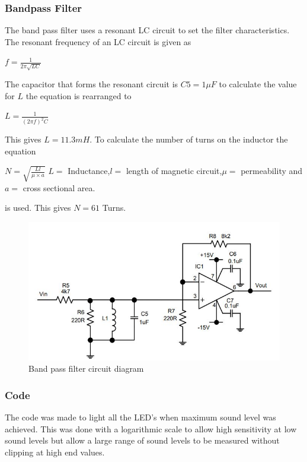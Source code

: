\documentclass[10pt,a4paper]{article}
\begin{document}
\subsubsection{Bandpass Filter}
The band pass filter uses a resonant LC circuit to set the filter characteristics. The resonant frequency of an LC circuit is given as 

\begin{center}
\Huge

$f = \frac{1}{2\pi\sqrt{LC}}$

\end{center}

The capacitor that forms the resonant circuit is $C5 = 1\mu F$
to calculate the value for $L$ the equation is rearranged to 
\begin{center}
\Huge

$L = \frac{1}{(2\pi f)^2 C}$

\end{center}
This gives $L = 11.3mH$. To calculate the number of turns on the inductor the equation

\begin{center}
\Huge

$N= \sqrt{\frac{Ll}{\mu \times a}}$
\normalsize
\newline
$L=$ Inductance,$l=$ length of magnetic circuit,$\mu=$ permeability and $a=$ cross sectional area. 

\end{center}


is used. This gives $N=61$ Turns.

\begin{figure}[!h]
\label{BPF}
\includegraphics[width= \textwidth]{Bandpass}
\caption{Band pass filter circuit diagram}

\end{figure}
\subsubsection{Code}
The code was made to light all the LED's when maximum sound level was achieved. This was done with a logarithmic scale to allow high sensitivity at low sound levels but allow a large range of sound levels to be measured without clipping at high end values.
\end{document}
